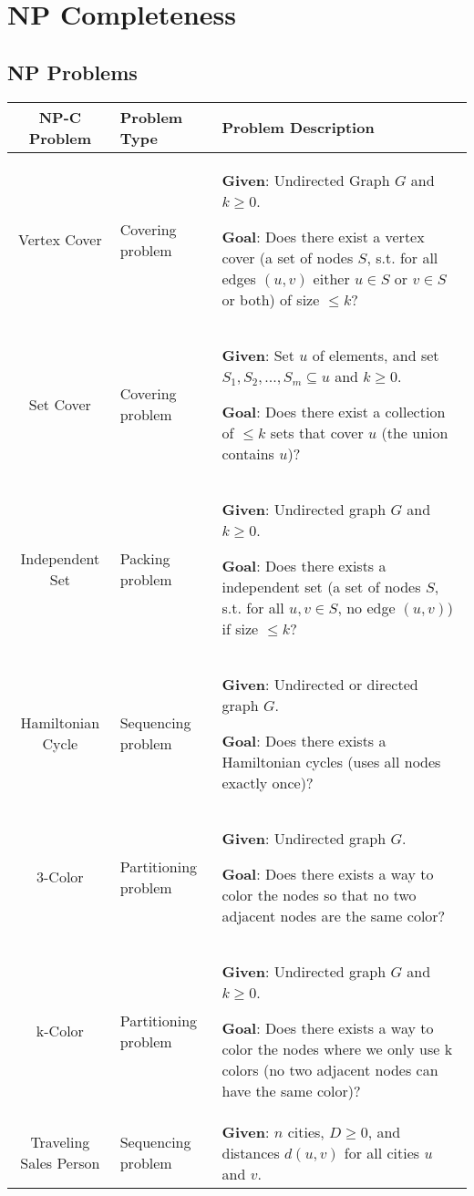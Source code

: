 \documentclass[]{article}
\begin{document}
\section{NP Completeness}
\subsection{NP Problems}
\begin{tabular}{|c|p{4cm}|p{9cm}|}
    \hline
    \textbf{NP-C Problem} & \textbf{Problem Type} & \textbf{Problem Description}\\
    \hline
    Vertex Cover & Covering problem & 
    \textbf{Given}: Undirected Graph $G$ and $k \geq 0$. 
    
    \textbf{Goal}: Does there exist a vertex cover (a set of nodes $S$, s.t. for all edges $(u,v)$ either $u \in S$ or $v \in S$ or both) of size $\leq k$?\\
    \hline
    Set Cover & Covering problem & 
    \textbf{Given}: Set $u$ of elements, and set $S_1, S_2, ..., S_m \subseteq u$ and $k \geq 0$. 
    
    \textbf{Goal}: Does there exist a collection of $\leq k$ sets that cover $u$ (the union contains $u$)?\\
    \hline
    Independent Set & Packing problem & 
    \textbf{Given}: Undirected graph $G$ and $k \geq 0$.
    
    \textbf{Goal}: Does there exists a independent set (a set of nodes $S$, s.t. for all $u,v \in S$, no edge $(u,v)$) if size $\leq k$?\\
    \hline
    Hamiltonian Cycle & Sequencing problem & 
    \textbf{Given}: Undirected or directed graph $G$.
    
    \textbf{Goal}: Does there exists a Hamiltonian cycles (uses all nodes exactly once)? \\
    \hline
    3-Color & Partitioning problem & 
    \textbf{Given}: Undirected graph $G$.
    
    \textbf{Goal}: Does there exists a way to color the nodes so that no two adjacent nodes are the same color? \\
    \hline
    k-Color & Partitioning problem & 
    \textbf{Given}: Undirected graph $G$ and $k \geq 0$.
    
    \textbf{Goal}: Does there exists a way to color the nodes where we only use k colors (no two adjacent nodes can have the same color)? \\
    \hline
    Traveling Sales Person & Sequencing problem & 
    \textbf{Given}: $n$ cities, $D \geq 0$, and distances $d(u,v)$ for all cities $u$ and $v$.
    

\end{tabular}
\end{document}
